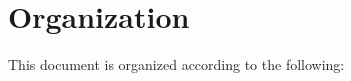 





% 

\section{Organization}\label{sec:organization}

This document is organized according to the following:

